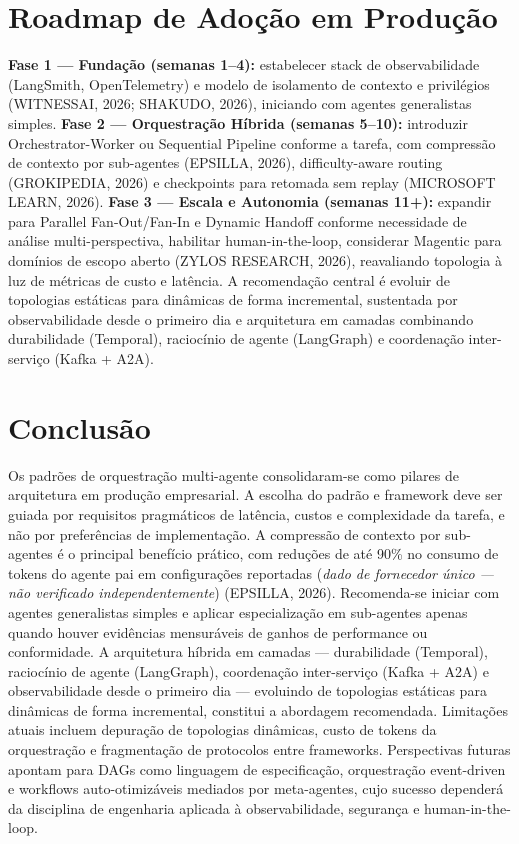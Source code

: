\documentclass[12pt,a4paper]{article}
\begin{document}
\section{Roadmap de Adoção em Produção}

\textbf{Fase 1 — Fundação (semanas 1–4):} estabelecer stack de observabilidade (LangSmith, OpenTelemetry) e modelo de isolamento de contexto e privilégios (WITNESSAI, 2026; SHAKUDO, 2026), iniciando com agentes generalistas simples. \textbf{Fase 2 — Orquestração Híbrida (semanas 5–10):} introduzir Orchestrator-Worker ou Sequential Pipeline conforme a tarefa, com compressão de contexto por sub-agentes (EPSILLA, 2026), difficulty-aware routing (GROKIPEDIA, 2026) e checkpoints para retomada sem replay (MICROSOFT LEARN, 2026). \textbf{Fase 3 — Escala e Autonomia (semanas 11+):} expandir para Parallel Fan-Out/Fan-In e Dynamic Handoff conforme necessidade de análise multi-perspectiva, habilitar human-in-the-loop, considerar Magentic para domínios de escopo aberto (ZYLOS RESEARCH, 2026), reavaliando topologia à luz de métricas de custo e latência. A recomendação central é evoluir de topologias estáticas para dinâmicas de forma incremental, sustentada por observabilidade desde o primeiro dia e arquitetura em camadas combinando durabilidade (Temporal), raciocínio de agente (LangGraph) e coordenação inter-serviço (Kafka + A2A).


\section{Conclusão}

Os padrões de orquestração multi-agente consolidaram-se como pilares de arquitetura em produção empresarial. A escolha do padrão e framework deve ser guiada por requisitos pragmáticos de latência, custos e complexidade da tarefa, e não por preferências de implementação. A compressão de contexto por sub-agentes é o principal benefício prático, com reduções de até 90\% no consumo de tokens do agente pai em configurações reportadas (\textit{dado de fornecedor único — não verificado independentemente}) (EPSILLA, 2026). Recomenda-se iniciar com agentes generalistas simples e aplicar especialização em sub-agentes apenas quando houver evidências mensuráveis de ganhos de performance ou conformidade. A arquitetura híbrida em camadas — durabilidade (Temporal), raciocínio de agente (LangGraph), coordenação inter-serviço (Kafka + A2A) e observabilidade desde o primeiro dia — evoluindo de topologias estáticas para dinâmicas de forma incremental, constitui a abordagem recomendada. Limitações atuais incluem depuração de topologias dinâmicas, custo de tokens da orquestração e fragmentação de protocolos entre frameworks. Perspectivas futuras apontam para DAGs como linguagem de especificação, orquestração event-driven e workflows auto-otimizáveis mediados por meta-agentes, cujo sucesso dependerá da disciplina de engenharia aplicada à observabilidade, segurança e human-in-the-loop.
\end{document}
